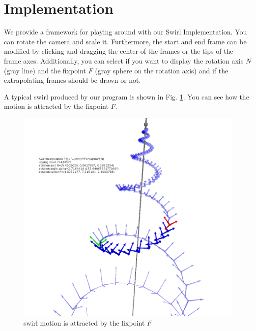 \documentclass[journal, letterpaper]{IEEEtran}
\begin{document}
\section{Implementation}
We provide a framework for playing around with our Swirl Implementation. You can rotate the camera and scale it. Furthermore, the start and end frame can be modified by clicking and dragging the center of the frames or the tips of the frame axes. Additionally, you can select if you want to display the rotation axis $N$ (gray line) and the fixpoint $F$ (gray sphere on the rotation axis) and if the extrapolating frames should be drawn or not. 

A typical swirl produced by our program is shown in Fig. \ref{fig:P3}. You can see how the motion is attracted by the fixpoint $F$.

\begin{figure}
	\centering
		\includegraphics[scale=0.4]{pictures/P3.png}
	\caption{swirl motion is attracted by the fixpoint $F$}
	\label{fig:P3}
\end{figure}
\end{document}
